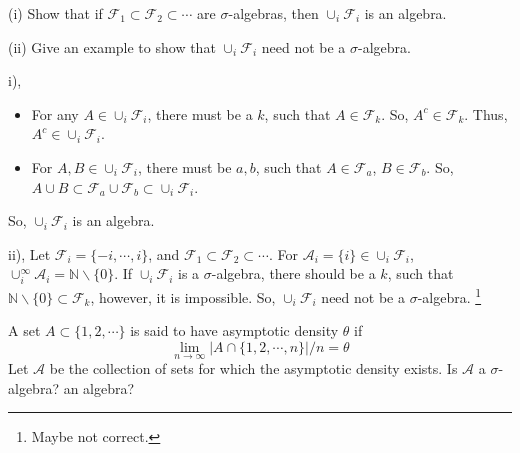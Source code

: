 \documentclass[en, normal, 11pt, black]{elegantnote}
\newenvironment{exercise}[1]{\begin{tcolorbox}[colback=black!15, colframe=black!80, breakable, title=#1]}{\end{tcolorbox}}
\renewenvironment{proof}{\begin{tcolorbox}[colback=white, colframe=black!50, breakable, title=Proof. ]\setlength{\parskip}{0.8em}}{\\\rightline{$\square$}\end{tcolorbox}}
\newenvironment{solution}{\begin{tcolorbox}[colback=white, colframe=black!50, breakable, title=Solution. ]\setlength{\parskip}{0.8em}}{\end{tcolorbox}}
\begin{document}
    \begin{exercise}{1.1.4}
        (i) Show that if $\mathcal{F}_1\subset\mathcal{F}_2\subset\cdots$ are $\sigma$-algebras, then $\cup_i\mathcal{F}_i$ is an algebra. 
        
        (ii) Give an example to show that $\cup_i\mathcal{F}_i$ need not be a $\sigma$-algebra. 
    \end{exercise}
    \begin{proof}
        i), 
        \begin{itemize}
            \item For any $A\in\cup_i\mathcal{F}_i$, there must be a $k$, such that $A\in\mathcal{F}_k$. So, $A^c\in\mathcal{F}_k$. Thus, $A^c\in\cup_i\mathcal{F}_i$. 
            \item For $A, B\in\cup_i\mathcal{F}_i$, there must be $a,b$, such that $A\in\mathcal{F}_a$, $B\in\mathcal{F}_b$. So, $A\cup B\subset\mathcal{F}_a\cup\mathcal{F}_b\subset\cup_i\mathcal{F}_i$. 
        \end{itemize} 
        So, $\cup_i\mathcal{F}_i$ is an algebra. 
    \end{proof}
    \begin{solution}
        ii), Let $\mathcal{F}_i=\{-i,\cdots,i\}$, and $\mathcal{F}_1\subset\mathcal{F}_2\subset\cdots$. 
        For $\mathcal{A}_i=\{i\}\in\cup_i\mathcal{F}_i$, $\cup_i^{\infty}\mathcal{A}_i=\mathbb{N}\backslash\{0\}$. 
        If $\cup_i\mathcal{F}_i$ is a $\sigma$-algebra, there should be a $k$, such that $\mathbb{N}\backslash\{0\}\subset\mathcal{F}_k$, however, it is impossible. So, $\cup_i\mathcal{F}_i$ need not be a $\sigma$-algebra. \footnote{Maybe not correct. }
    \end{solution}

    \begin{exercise}{1.1.5}
        A set $A \subset \{1,2, \cdots\}$ is said to have asymptotic density $\theta$ if
        \[
        \lim _{n \rightarrow \infty}|A \cap\{1,2, \cdots, n\}| / n=\theta
        \]
        Let $\mathcal{A}$ be the collection of sets for which the asymptotic density exists. Is $\mathcal{A}$ a $\sigma$-algebra? an algebra?
    \end{exercise}
\end{document}
